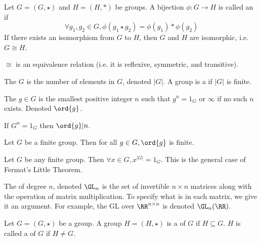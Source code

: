 \documentclass{article}
\begin{document}
\begin{defn}
  Let $G = (G, \star)$ and $H = (H, *)$ be groups. A bijection
  $\phi : G \rightarrow H$ is called an  if
  $$\forall g_1, g_2 \in G, \phi(g_1 \star g_2) = \phi(g_1) * \phi(g_2)$$
  If there exists an isomorphism from $G$ to $H$, then $G$ and $H$ are isomorphic,
  i.e. $G \cong H$. 
\end{defn}

\begin{remark}
  $\cong$ is an equivalence relation (i.e. it is reflexive, symmetric, and transitive). 
\end{remark}

\begin{defn}
  The  $G$ is the number of elements in $G$, denoted $|G|$.
  A group is a  if $|G|$ is finite.
\end{defn}

\begin{defn}
  The  $g \in G$ is the smallest positive integer $n$
  such that $g^n = 1_G$ or $\infty$ if no such $n$ exists. Denoted $\ord{g}$. 
\end{defn}

\begin{fact}
  If $G^n = 1_G$ then $\ord{g} | n$. 
\end{fact}

\begin{fact}
  Let $G$ be a finite group. Then for all $g \in G, \ord{g}$ is finite.
\end{fact}

\begin{nthm}  
  Let $G$ be any finite group. Then $\forall x \in G, x^{|G|} = 1_G$.
  This is the general case of Fermat's Little Theorem. 
\end{nthm}

\begin{defn}
  The  of degree $n$, denoted $\GL_n$ is the set of
  invertible $n \times n$ matrices along with the operation of matrix
  multiplication. To specify what is in each matrix, we give it an argument.
  For example, the GL over $\RR^{n \times n}$ is denoted $\GL_n(\RR)$. 
\end{defn}

\begin{defn}
  Let $G = (G, \star)$ be a group. A group $H = (H, \star)$ is a
   of $G$ if $H \subseteq G$. $H$ is called a 
  of $G$ if $H \neq G$. 
\end{defn}
\end{document}
